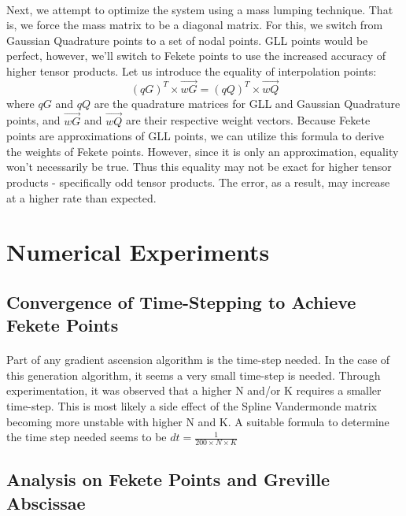 \documentclass{article}
\begin{document}
\paragraph{}
Next, we attempt to optimize the system using a mass lumping technique. That is, we force the mass matrix to be a diagonal matrix. For this, we switch from Gaussian Quadrature points to a set of nodal points. GLL points would be perfect, however, we'll switch to Fekete points to use the increased accuracy of higher tensor products. Let us introduce the equality of interpolation points: 
\begin{equation*}
(qG)^T\times \vec{wG}=(qQ)^T\times \vec{wQ}
\end{equation*}
where $qG$ and $qQ$ are the quadrature matrices for GLL and Gaussian Quadrature points, and $\vec{wG}$ and $\vec{wQ}$ are their respective weight vectors. Because Fekete points are approximations of GLL points, we can utilize this formula to derive the weights of Fekete points. However, since it is only an approximation, equality won't necessarily be true. Thus this equality may not be exact for higher tensor products - specifically odd tensor products. The error, as a result, may increase at a higher rate than expected.

\section*{Numerical Experiments}
\subsection*{Convergence of Time-Stepping to Achieve Fekete Points}
\paragraph{}
Part of any gradient ascension algorithm is the time-step needed. In the case of this generation algorithm, it seems a very small time-step is needed. Through experimentation, it was observed that a higher N and/or K requires a smaller time-step. This is most likely a side effect of the Spline Vandermonde matrix becoming more unstable with higher N and K. A suitable formula to determine the time step needed seems to be $dt = \frac{1}{200\times N\times K}$

\subsection*{Analysis on Fekete Points and Greville Abscissae}
\end{document}

